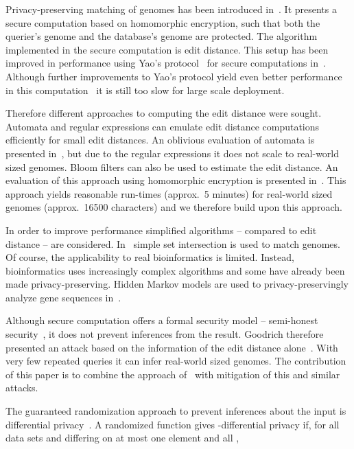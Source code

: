 \documentclass{llncs}
\begin{document}
Privacy-preserving matching of genomes has been introduced in~\cite{AtaKer03}.
It presents a secure computation based on homomorphic encryption, such that both the querier's genome and the database's genome are protected.
The algorithm implemented in the secure computation is edit distance.
This setup has been improved in performance using Yao's protocol~\cite{Yao86} for secure computations in~\cite{JhaKru08}.
Although further improvements to Yao's protocol yield even better performance in this computation~\cite{HuaEva11} it is still too slow for large scale deployment.

Therefore different approaches to computing the edit distance were sought.
Automata and regular expressions can emulate edit distance computations efficiently for small edit distances.
An oblivious evaluation of automata is presented in~\cite{TroKat07}, but due to the regular expressions it does not scale to real-world sized genomes.
Bloom filters can also be used to estimate the edit distance.
An evaluation of this approach using homomorphic encryption is presented in~\cite{BecKer12}.
This approach yields reasonable run-times (approx.~5 minutes) for real-world sized genomes  (approx.~16500 characters) and we therefore build upon this approach.



In order to improve performance simplified algorithms -- compared to edit distance -- are considered.
In~\cite{BalBar11} simple set intersection is used to match genomes.
Of course, the applicability to real bioinformatics is limited.
Instead, bioinformatics uses increasingly complex algorithms and some have already been made privacy-preserving.
Hidden Markov models are used to privacy-preservingly analyze gene sequences in~\cite{FraKat11}.

Although secure computation offers a formal security model -- semi-honest security~\cite{Gol04}, it does not prevent inferences from the result.
Goodrich therefore presented an attack based on the information of the edit distance alone~\cite{Goo09}.
With very few repeated queries it can infer real-world sized genomes.
The contribution of this paper is to combine the approach of~\cite{BecKer12} with mitigation of this and similar attacks.

The guaranteed randomization approach to prevent inferences about the input is differential privacy~\cite{Dwo08}.
A randomized function  gives -differential privacy if, for all data sets  and  differing on at most one element and all ,
\end{document}
